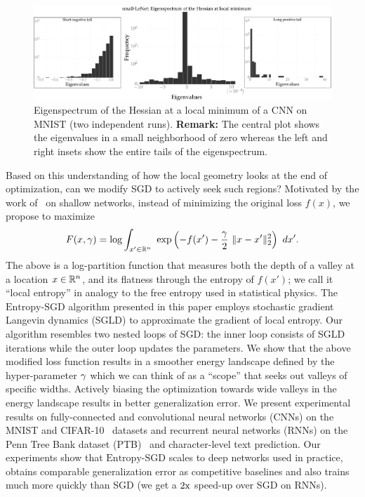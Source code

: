 \documentclass[10pt]{article}
\newcommand{\entropysgd}{\mathrm{Entropy}\textrm{-}\mathrm{SGD}}
\begin{document}
\begin{figure}[tbh]
\centering
\includegraphics[width=\textwidth]{lenet_hessian.pdf}
\caption{\small Eigenspectrum of the Hessian at a local minimum of a CNN on MNIST (two independent runs). \textbf{Remark:} The central plot shows the eigenvalues in a small neighborhood of zero whereas the left and right insets show the entire tails of the eigenspectrum.}
\label{fig:lenet_hessian}
\end{figure}

Based on this understanding of how the local geometry looks at the end of optimization, can we modify SGD to actively seek such regions? Motivated by the work of~\citet{baldassi2015subdominant} on shallow networks, instead of minimizing the original loss $f(x)$, we propose to maximize
$$
F(x, \g) = \log \int_{x' \in \reals^n}\ \exp \rbrac{-f(x') - \f{\g}{2}\ \norm{x-x'}^2_2}\ dx'.
$$
The above is a log-partition function that measures both the depth of a valley at a location  $x \in \mathbb{R}^n$, and its flatness through the entropy of $f(x')$; we call it ``local entropy'' in analogy to the free entropy used in statistical physics. The $\entropysgd$ algorithm presented in this paper employs stochastic gradient Langevin dynamics (SGLD) to approximate the gradient of local entropy. Our algorithm resembles two nested loops of SGD: the inner loop consists of SGLD iterations while the outer loop updates the parameters. We show that the above modified loss function results in a smoother energy landscape defined by the hyper-parameter $\gamma$ which we can think of as a ``scope'' that seeks out valleys of specific widths. Actively biasing the optimization towards wide valleys in the energy landscape results in better generalization error. We present experimental results on fully-connected and convolutional neural networks (CNNs) on the MNIST and CIFAR-10~\citep{krizhevsky2009learning} datasets and recurrent neural networks (RNNs) on the Penn Tree Bank dataset (PTB)~\citep{marcus1993building} and character-level text prediction. Our experiments show that $\entropysgd$ scales to deep networks used in practice, obtains comparable generalization error as competitive baselines and also trains much more quickly than SGD (we get a $2\mathrm{x}$ speed-up over SGD on RNNs).
\end{document}
